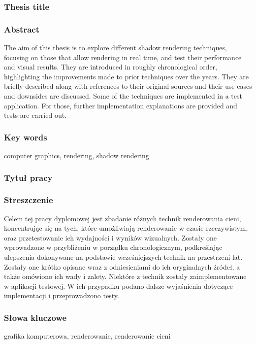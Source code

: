 \subsubsection*{Thesis title}
\Title

\subsubsection*{Abstract}
The aim of this thesis is to explore different shadow rendering techniques, focusing on those that allow rendering in real time, and test their performance and visual results. They are introduced in roughly chronological order, highlighting the improvements made to prior techniques over the years. They are briefly described along with references to their original sources and their use cases and downsides are discussed. Some of the techniques are implemented in a test application. For those, further implementation explanations are provided and tests are carried out.

\subsubsection*{Key words}
computer graphics, rendering, shadow rendering

\subsubsection*{Tytuł pracy}
\begin{otherlanguage}{polish}
\TitleAlt
\end{otherlanguage}

\subsubsection*{Streszczenie}
\begin{otherlanguage}{polish}
Celem tej pracy dyplomowej jest zbadanie różnych technik renderowania cieni, koncentrując się na tych, które umożliwiają renderowanie w czasie rzeczywistym, oraz przetestowanie ich wydajności i wyników wizualnych. Zostały one wprowadzone w przybliżeniu w porządku chronologicznym, podkreślając ulepszenia dokonywane na podstawie wcześniejszych technik na przestrzeni lat. Zostały one krótko opisane wraz z odniesieniami do ich oryginalnych źródeł, a także omówiono ich wady i zalety. Niektóre z technik zostały zaimplementowane w aplikacji testowej. W ich przypadku podano dalsze wyjaśnienia dotyczące implementacji i przeprowadzono testy.
\end{otherlanguage}

\subsubsection*{Słowa kluczowe}
\begin{otherlanguage}{polish}
grafika komputerowa, renderowanie, renderowanie cieni
\end{otherlanguage}
